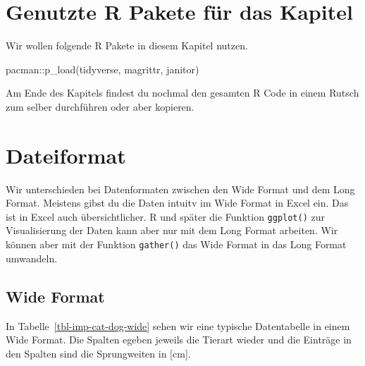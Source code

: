 \documentclass[
  letterpaper,
]{scrbook}
\newenvironment{Shaded}{\begin{snugshade}}{\end{snugshade}}
\newcommand{\FunctionTok}[1]{\textcolor[rgb]{0.28,0.35,0.67}{#1}}
\newcommand{\NormalTok}[1]{\textcolor[rgb]{0.00,0.23,0.31}{#1}}
\newcommand{\SpecialCharTok}[1]{\textcolor[rgb]{0.37,0.37,0.37}{#1}}
\begin{document}
\hypertarget{genutzte-r-pakete-fuxfcr-das-kapitel}{%
\section{Genutzte R Pakete für das
Kapitel}\label{genutzte-r-pakete-fuxfcr-das-kapitel}}

Wir wollen folgende R Pakete in diesem Kapitel nutzen.

\begin{Shaded}
\begin{Highlighting}[]
\NormalTok{pacman}\SpecialCharTok{::}\FunctionTok{p\_load}\NormalTok{(tidyverse, magrittr, janitor)}
\end{Highlighting}
\end{Shaded}

Am Ende des Kapitels findest du nochmal den gesamten R Code in einem
Rutsch zum selber durchführen oder aber kopieren.

\hypertarget{sec-format}{%
\section{Dateiformat}\label{sec-format}}


Wir unterschieden bei Datenformaten zwischen den Wide Format und dem
Long Format. Meistens gibst du die Daten intuitv im Wide Format in Excel
ein. Das ist in Excel auch übersichtlicher. R und später die Funktion
\texttt{ggplot()} zur Visualisierung der Daten kann aber nur mit dem
Long Format arbeiten. Wir können aber mit der Funktion \texttt{gather()}
das Wide Format in das Long Format umwandeln.

\hypertarget{wide-format}{%
\subsection{Wide Format}\label{wide-format}}

In Tabelle~\ref{tbl-imp-cat-dog-wide} sehen wir eine typische
Datentabelle in einem Wide Format. Die Spalten egeben jeweils die
Tierart wieder und die Einträge in den Spalten sind die Sprungweiten in
{[}cm{]}.
\end{document}
